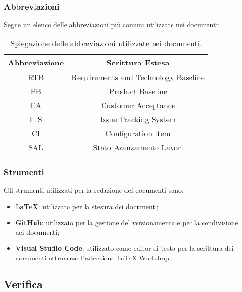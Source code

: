 \subsubsection{Abbreviazioni}
Segue un elenco delle abbreviazioni più comuni utilizzate nei documenti:

\begin{table}[!h]
	\centering
	\begin{tabular}{|c|c|}
		\hline
		\textbf{Abbreviazione} & \textbf{Scrittura Estesa}            \\
		\hline
		RTB                    & Requirements and Technology Baseline \\
		PB                     & Product Baseline                     \\
		CA                     & Customer Acceptance                  \\
		ITS                    & Issue Tracking System                \\
		CI                     & Configuration Item                   \\
		SAL                    & Stato Avanzamento Lavori             \\
		\hline
	\end{tabular}
	\caption{Spiegazione delle abbreviazioni utilizzate nei documenti.}
	\label{tab:1}
\end{table}


\subsubsection{Strumenti}
Gli strumenti utilizzati per la redazione dei documenti sono:
\begin{itemize}
	\item \textbf{\LaTeX{}}: utilizzato per la stesura dei documenti;
	\item \textbf{GitHub}: utilizzato per la gestione del versionamento e per la condivisione dei documenti;
	\item \textbf{Visual Studio Code}: utilizzato come editor di testo per la scrittura dei documenti attraverso l'estensione \LaTeX{} Workshop.
\end{itemize}

\subsection{Verifica}
